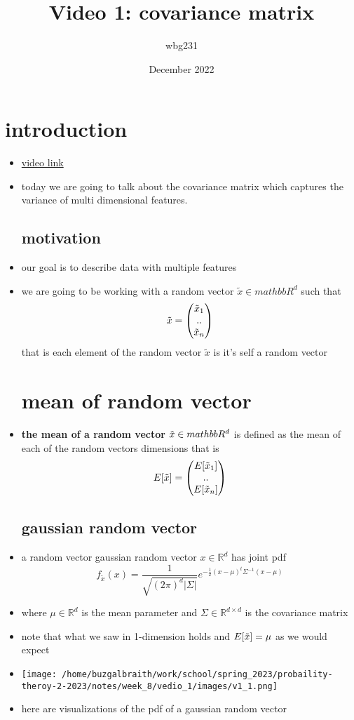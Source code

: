 \documentclass{article}
\title{Video 1: covariance matrix}
\author{wbg231 }
\date{December 2022}
\begin{document}
\maketitle

\section{introduction}
\begin{itemize}
\item \href{https://www.youtube.com/watch?v=olyVNcJknNg&ab_channel=CarlosFernandez-Granda}{video link}
\item today we are going to talk about the covariance matrix which captures the variance of multi dimensional features. 
\subsection*{motivation}
\item our goal is to describe data with multiple features 
\item we are going to be working with a random vector $\tilde{x}\in mathbb{R}^{d}$ such that $$\tilde{x}=\begin{pmatrix}
    \Tilde{x}_1\\..\\\Tilde{x}_n
\end{pmatrix}$$
that is each element of the random vector $\tilde{x}$ is it's self a random vector
\section*{mean of random vector}
\item \textbf{the mean of a random vector} $\Tilde{x}\in mathbb{R}^{d}$ is defined as the mean of each of the random vectors
 dimensions that is$$E[\tilde{x}]=\begin{pmatrix}
    E[\Tilde{x}_1]\\..\\E[\Tilde{x}_n]
\end{pmatrix}$$
\subsection*{gaussian random vector}
\item a random vector gaussian random vector $x\in \mathbb{R}^{d}$ has joint pdf $$f_{\tilde{x}}(x)=\frac{1}{\sqrt{(2\pi)^d|\Sigma
|}}e^{-\frac{1}{2}(x-\mu)^t\Sigma^{-1}(x-\mu)}$$
\item where $\mu\in \mathbb{R}^d$ is the mean parameter and $\Sigma\in \mathbb{R}^{d\times d }$ is the covariance matrix 
\item note that what we saw in 1-dimension holds and $E[\Tilde{x}]=\mu$ as we would expect
\item \texttt{[image: /home/buzgalbraith/work/school/spring\_2023/probaility-theroy-2-2023/notes/week\_8/vedio\_1/images/v1\_1.png]}
\item here are visualizations of the pdf of a gaussian random vector 

\end{itemize}
\end{document}
